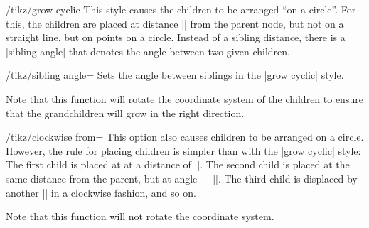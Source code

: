 \begin{key}{/tikz/grow cyclic}
    This style causes the children to be arranged ``on a circle''. For this,
    the children are placed at distance |\tikzleveldistance| from the parent
    node, but not on a straight line, but on points on a circle. Instead of a
    sibling distance, there is a |sibling angle| that denotes the angle between
    two given children.
    \begin{key}{/tikz/sibling angle=}
        Sets the angle between siblings in the |grow cyclic| style.
    \end{key}
    Note that this function will rotate the coordinate system of the children
    to ensure that the grandchildren will grow in the right direction.
\begin{codeexample}[preamble={\usetikzlibrary{trees}}]
\end{codeexample}
\end{key}

\begin{key}{/tikz/clockwise from=}
    This option also causes children to be arranged on a circle. However, the
    rule for placing children is simpler than with the |grow cyclic| style: The
    first child is placed at  at a distance of
    |\tikzleveldistance|. The second child is placed at the same distance from
    the parent, but at angle ${}-{}$|\tikzsiblingangle|. The third
    child is displaced by another |\tikzsiblingangle| in a clockwise fashion,
    and so on.

    Note that this function will not rotate the coordinate system.
\begin{codeexample}[preamble={\usetikzlibrary{trees}}]
\end{codeexample}
\end{key}

